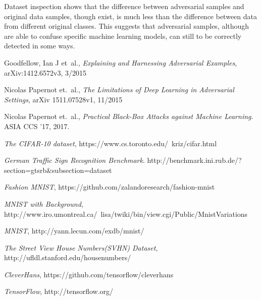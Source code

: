 \documentclass{article}
\begin{document}
Dataset inspection shows that the difference between adversarial samples and original data samples, though exist, is much less than the difference between data from different original classes. This suggests that adversarial samples, although are able to confuse specific machine learning models, can still to be correctly detected in some ways.


\begin{thebibliography}{9}
\raggedright
{}
    Goodfellow, Ian J et\ al.,
    \emph{Explaining and Harnessing Adversarial Examples},  
    arXiv:1412.6572v3,
    3/2015

    Nicolas Papernot et.\ al.,
   \emph{The Limitations of Deep Learning in Adversarial Settings},
    arXiv 1511.07528v1,
    11/2015

    Nicolas Papernot et.\ al.,
    \emph{Practical Black-Box Attacks against Machine Learning}.
    ASIA CCS '17,
    2017.

    \emph{The CIFAR-10 dataset},
    https://www.cs.toronto.edu/~kriz/cifar.html

    \emph{German Traffic Sign Recognition Benchmark}.
    http://benchmark.ini.rub.de/?section=gtsrb\&subsection=dataset

    \emph{Fashion MNIST},
    https://github.com/zalandoresearch/fashion-mnist

    \emph{MNIST with Background},
    http://www.iro.umontreal.ca/~lisa/twiki/bin/view.cgi/Public/MnistVariations

    \emph{MNIST},
    http://yann.lecun.com/exdb/mnist/

    \emph{The Street View House Numbers(SVHN) Dataset},
    http://ufldl.stanford.edu/housenumbers/

    \emph{CleverHans},
    https://github.com/tensorflow/cleverhans

    \emph{TensorFlow},
    http://tensorflow.org/

\end{thebibliography}
\end{document}
